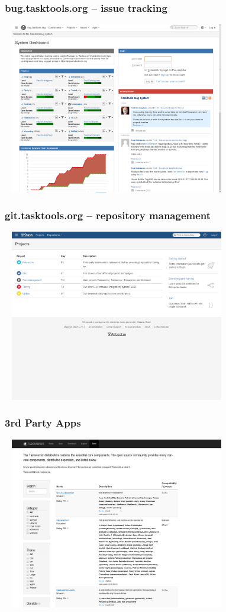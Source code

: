 \documentclass[t,handout]{beamer}
\begin{document}
\begin{frame}\frametitle{bug.tasktools.org -- issue tracking}
    \begin{center}
        \href{https://bug.tasktools.org/}{\includegraphics[width=10cm,height=7.5cm]{bug-tasktools-org.png}}
    \end{center}
\end{frame}

\begin{frame}\frametitle{git.tasktools.org -- repository management}
    \begin{center}
        \href{https://git.tasktools.org/}{\includegraphics[width=10cm,height=7.5cm]{git-tasktools-org.png}}
    \end{center}
\end{frame}

\begin{frame}\frametitle{3rd Party Apps}
    \begin{center}
        \href{http://taskwarrior.org/tools/}{\includegraphics[width=10cm,height=7.5cm]{3rdparty.png}}
    \end{center}
\end{frame}
\end{document}
